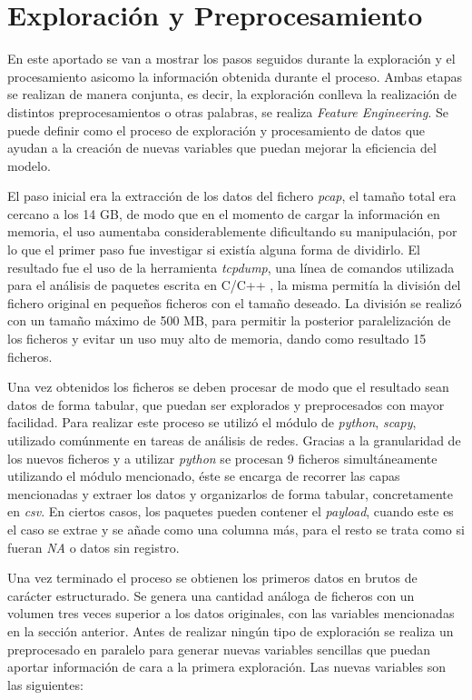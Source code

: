 \section{Exploración y Preprocesamiento}

En este aportado se van a mostrar los pasos seguidos durante la exploración y  el procesamiento asicomo la información obtenida durante el proceso. Ambas etapas se realizan de manera conjunta, es decir, la exploración conlleva la realización de distintos preprocesamientos o otras palabras, se realiza \textit{Feature Engineering}. Se puede definir como el proceso de exploración y procesamiento de datos que ayudan a la creación de nuevas variables que puedan mejorar la eficiencia del modelo\cite{fe}.

El paso inicial era la extracción de los datos del fichero \textit{pcap}, el tamaño total era cercano a los 14 GB, de modo que en el momento de cargar la información en memoria, el uso aumentaba considerablemente dificultando su manipulación, por lo que el primer paso fue investigar si existía alguna forma de dividirlo. El resultado fue el uso de la herramienta \textit{tcpdump}, una línea de comandos utilizada para el análisis de paquetes escrita en C/C++ \cite{tcpdump}, la misma permitía la división del fichero original en pequeños ficheros con el tamaño deseado. La división se realizó con un tamaño máximo de 500 MB, para permitir la posterior paralelización de los ficheros y evitar un uso muy alto de memoria, dando como resultado 15 ficheros.

Una vez obtenidos los ficheros se deben procesar de modo que el resultado sean datos de forma tabular, que puedan ser explorados y preprocesados con mayor facilidad. Para realizar este proceso se utilizó el módulo de \textit{python}, \textit{scapy}, utilizado comúnmente en tareas de análisis de redes. Gracias a la granularidad de los nuevos ficheros y a utilizar \textit{python} se procesan 9 ficheros simultáneamente utilizando el módulo mencionado, éste se encarga de recorrer las capas mencionadas y extraer los datos y organizarlos de forma tabular, concretamente en \textit{csv}. En ciertos casos, los paquetes pueden contener el \textit{payload}, cuando este es el caso se extrae y se añade como una columna más, para el resto se trata como si fueran \textit{NA} o datos sin registro. 

Una vez terminado el proceso se obtienen los primeros datos en brutos de carácter estructurado. Se genera una cantidad análoga de ficheros con un volumen tres veces superior a los datos originales, con las variables mencionadas en la sección anterior. Antes de realizar ningún tipo de exploración se realiza un preprocesado en paralelo para generar nuevas variables sencillas que puedan aportar información de cara a la primera exploración. Las nuevas variables son las siguientes:

